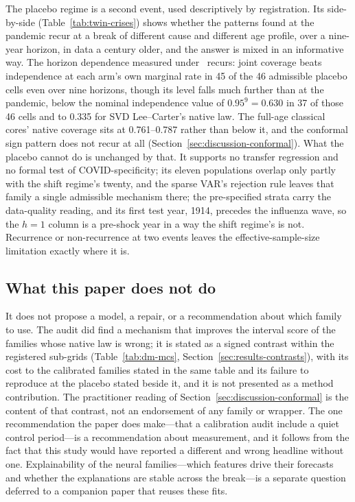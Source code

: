 The placebo regime is a second event, used descriptively by registration.
Its side-by-side (Table~\ref{tab:twin-crises}) shows whether the patterns
found at the pandemic recur at a break of different cause and different
age profile, over a nine-year horizon, in data a century older, and the
answer is mixed in an informative way. The horizon dependence measured
under \Hthree\ recurs: joint coverage beats independence at each arm's
own marginal rate in 45 of the 46 admissible placebo cells even over nine
horizons, though its level falls much further than at the pandemic, below
the nominal independence value of $0.95^9=0.630$ in 37 of those 46 cells
and to 0.335 for SVD Lee--Carter's native law. The full-age classical
cores' native coverage sits at 0.761--0.787 rather than below it, and the
conformal sign pattern does not recur at all
(Section~\ref{sec:discussion-conformal}). What the placebo cannot do is
unchanged by that. It supports no transfer regression and no formal test
of COVID-specificity; its eleven populations overlap only partly with the
shift regime's twenty, and the sparse VAR's rejection rule leaves that
family a single admissible mechanism there; the
pre-specified strata carry the data-quality reading, and its first test
year, 1914, precedes the influenza wave, so the $h=1$ column is a
pre-shock year in a way the shift regime's is not. Recurrence or
non-recurrence at two events leaves the effective-sample-size limitation
exactly where it is.

\subsection{What this paper does not do}

It does not propose a model, a repair, or a recommendation about which
family to use. The audit did find a mechanism that improves the interval
score of the families whose native law is wrong; it is stated as a signed
contrast within the registered sub-grids (Table~\ref{tab:dm-mcs},
Section~\ref{sec:results-contrasts}), with its cost to the calibrated
families stated in the same table and its failure to reproduce at the
placebo stated beside it, and it is not presented as a method
contribution. The practitioner reading of
Section~\ref{sec:discussion-conformal} is the content of that contrast,
not an endorsement of any family or wrapper. The one recommendation the
paper does make---that a calibration audit include a quiet control
period---is a recommendation about measurement, and it follows from the
fact that this study would have reported a different and wrong headline
without one. Explainability of the neural families---which features drive
their forecasts and whether the explanations are stable across the
break---is a separate question deferred to a companion paper that reuses
these fits.

